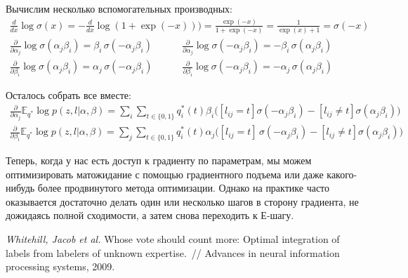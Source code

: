 \documentclass[12pt,a4paper]{article}
\begin{document}
\begin{esSolution}
    Вычислим несколько вспомогательных производных:
    \begin{gather*}
        \frac{d}{dx} \log \sigma(x) = - \frac{d}{dx} \log (1 + \exp(-x))) = \frac{\exp(-x)}{1 + \exp(-x)} = \frac{1}{\exp(x) + 1} = \sigma(-x) \\
        \frac{\partial}{\partial \alpha_j} \log \sigma(\alpha_j \beta_i) = \beta_i \, \sigma(-\alpha_j \beta_i) \quad\quad\quad \frac{\partial}{\partial \alpha_j} \log \sigma(-\alpha_j \beta_i) = -\beta_i \, \sigma(\alpha_j \beta_i) \\ 
        \frac{\partial}{\partial \beta_i} \log \sigma(\alpha_j \beta_i) = \alpha_j \, \sigma(-\alpha_j \beta_i) \quad\quad\quad \frac{\partial}{\partial \beta_i} \log \sigma(-\alpha_j \beta_i) = -\alpha_j \, \sigma(\alpha_j \beta_i)
    \end{gather*}
    
    Осталось собрать все вместе:
    \begin{gather*}
        \frac{\partial}{\partial \alpha_j} \mathbb{E}_{q^*} \log p(z, l | \alpha, \beta) = \sum_i \sum_{t \in \{0, 1\}} q_i^*(t) \beta_i \Big([l_{ij} = t]  \sigma (- \alpha_j \beta_i) - [l_{ij} \ne t] \sigma(\alpha_j \beta_i) \Big) \\
        \frac{\partial}{\partial \beta_i} \mathbb{E}_{q^*} \log p(z, l | \alpha, \beta) = \sum_j \sum_{t \in \{0, 1\}} q_i^*(t) \alpha_j \Big([l_{ij} = t] \, \sigma (-\alpha_j \beta_i) - [l_{ij} \ne t] \sigma(\alpha_j \beta_i) \Big)
    \end{gather*}
    
    \par Теперь, когда у нас есть доступ к градиенту по параметрам, мы можем оптимизировать матожидание с помощью градиентного подъема или даже какого-нибудь более продвинутого метода оптимизации. Однако на практике часто оказывается достаточно делать один или несколько шагов в сторону градиента, не дожидаясь полной сходимости, а затем снова переходить к Е-шагу.
\end{esSolution}

\begin{thebibliography}{1}
    \emph{Whitehill, Jacob et al.}
    Whose vote should count more: Optimal integration of labels from labelers of unknown expertise.~// Advances in neural information processing systems, 2009.
\end{thebibliography}
\end{document}
